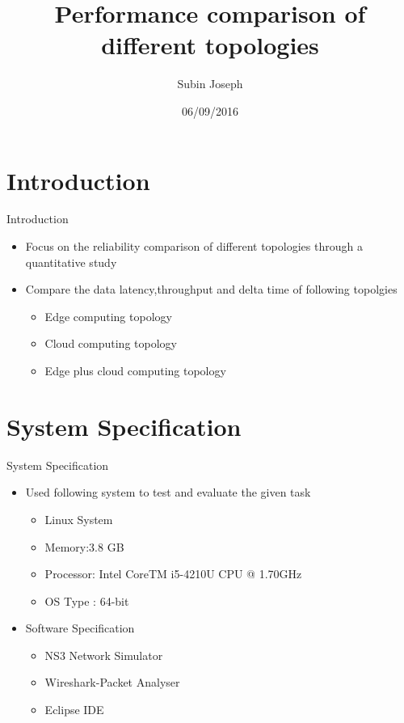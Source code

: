 \documentclass{beamer}
\title[Your Short Title]{Performance comparison of different topologies}
\author{Subin Joseph}
\institute{TU Kaiserslautern}
\date{06/09/2016}
\begin{document}
\begin{frame}
  \titlepage

\end{frame}


\section{Introduction}

\begin{frame}{Introduction}



\begin{itemize}
  \item Focus on the reliability comparison of different topologies through a quantitative study
  \item Compare the data latency,throughput and delta time of following topolgies
  \begin{itemize}
  	\item Edge computing topology
  	\item Cloud computing topology
  	\item Edge plus cloud computing topology
  \end{itemize}

\end{itemize}


\end{frame}
\section{System Specification}
\begin{frame}{System Specification}
\begin{itemize}
  \item Used following system to test and evaluate the given task 
  \begin{itemize}
  	\item Linux System
  	\item Memory:3.8 GB
  	\item Processor: Intel CoreTM 		  i5-4210U CPU @ 1.70GHz
  	\item OS Type : 64-bit

  \end{itemize}
\item Software Specification
  \begin{itemize}
  	\item NS3 Network Simulator
  	\item Wireshark-Packet Analyser
  	\item Eclipse IDE
  \end{itemize}
\end{itemize}
\end{frame}
\end{document}
